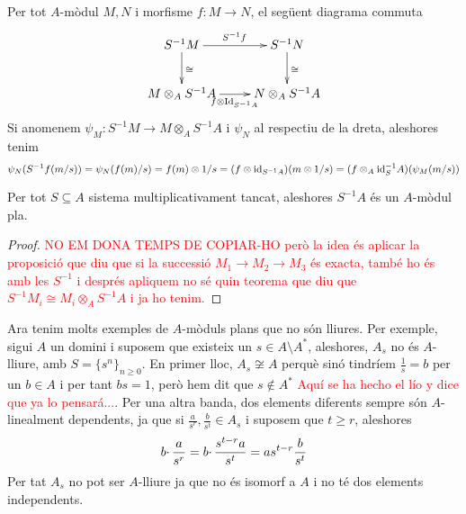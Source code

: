 \documentclass[../main.tex]{subfiles}
\begin{document}
\begin{coro}
Per tot $A$-mòdul $M,N$ i morfisme $f:M\to N$, el següent diagrama commuta
\begin{equation}
    \notag
    \xymatrix{
    S^{-1}M\ar[d]^\cong\ar[r]^{S^{-1}f} & S^{-1}N\ar[d]^\cong \\
    M\otimes_AS^{-1}A\ar[r]_{f\otimes\mathrm{Id}_{S^{-1}A}} & N\otimes_AS^{-1}A
    }
\end{equation}
Si anomenem $\psi_M:S^{-1}M\to M\otimes_AS^{-1}A$ i $\psi_N$ al respectiu de la dreta, aleshores tenim 
\begin{equation}
    \notag
    \psi_N(S^{-1}f(m/s)) = \psi_N(f(m)/s) = f(m)\otimes 1/s = (f\otimes\mathrm{id}_{S^{-1}A})(m\otimes 1/s) = (f\otimes_A\mathrm{id}_S^{-1}A)(\psi_M(m/s))
\end{equation}
\end{coro}

\begin{coro}
Per tot $S\subseteq A$ sistema multiplicativament tancat, aleshores $S^{-1}A$ és un $A$-mòdul pla.
\end{coro}
\begin{proof}
\textcolor{red}{NO EM DONA TEMPS DE COPIAR-HO però la idea és aplicar la proposició que diu que si la successió $M_1\to M_2\to M_3$ és exacta, també ho és amb les $S^{-1}$ i després apliquem no sé quin teorema que diu que $S^{-1}M_i\cong M_i\otimes_AS^{-1}A$ i ja ho tenim.}
\end{proof}

\begin{nota}
Ara tenim molts exemples de $A$-mòduls plans que no són lliures. Per exemple, sigui $A$ un domini i suposem que existeix un $s\in A\setminus A^*$, aleshores, $A_s$ no és $A$-lliure, amb $S = \{s^n\}_{n\geq 0}$. En primer lloc, $A_s\not\cong A$ perquè sinó tindríem $\frac{1}{s} = b$ per un $b\in A$ i per tant $bs = 1$, però hem dit que $s\not\in A^*$ \textcolor{red}{Aquí se ha hecho el lío y dice que ya lo pensará...}. Per una altra banda, dos elements diferents sempre són $A$-linealment dependents, ja que si $\frac{a}{s^r},\frac{b}{s^t}\in A_s$ i suposem que $t\geq r$, aleshores
\begin{equation}
    \notag
    b\cdotp\frac{a}{s^r} = b\cdotp\frac{s^{t-r}a}{s^t} = as^{t-r}\frac{b}{s^t}
\end{equation}
Per tat $A_s$ no pot ser $A$-lliure ja que no és isomorf a $A$ i no té dos elements independents.
\end{nota}
\end{document}
